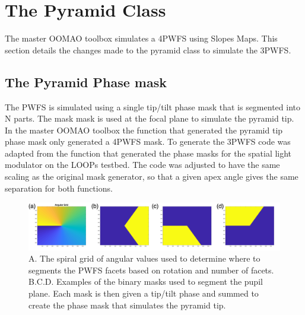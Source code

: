                         





\section{The Pyramid Class}
The master OOMAO toolbox simulates a 4PWFS using Slopes Maps. This section details the changes made to the pyramid class to simulate the 3PWFS.


\subsection{The Pyramid Phase mask}
The PWFS is simulated using a single tip/tilt phase mask that is segmented into N parts. The mask mask is used at the focal plane to simulate the pyramid tip. In the master OOMAO toolbox the function that generated the pyramid tip phase mask only generated a 4PWFS mask. To generate the 3PWFS code was adapted from the function that generated the phase masks for the spatial light modulator on the LOOPs testbed. The code was adjusted to have the same scaling as the original mask generator, so that a given apex angle gives the same separation for both functions.
\begin{figure}
    \centering
    \includegraphics[width=1\textwidth]{Chapter Materials/Chapter Four Materials/phaseMask.png}
    \caption{A. The spiral grid of angular values used to determine where to segments the PWFS facets based on rotation and number of facets. B.C.D. Examples of the binary masks used to segment the pupil plane. Each mask is then given a tip/tilt phase and summed to create the phase mask that simulates the pyramid tip. }
    \label{fig:phaseMask}
\end{figure}

